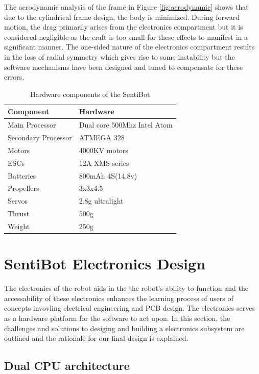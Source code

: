 \documentclass[12pt]{article}
\begin{document}
The aerodynamic analysis of the frame in Figure \ref{fig:aerodynamic} shows that due to the cylindrical frame design, the body is minimized. During forward motion, the drag primarily arises from the electronics compartment but it is considered negligible as the craft is too small for these effects to manifest in a significant manner. The one-sided nature of the electronics compartment results in the loss of radial symmetry which gives rise to some instability but the software mechanisms have been designed and tuned to compensate for these errors.

\begin{table}[h]
	\centering
	\begin{tabular}{ | l | l | }
		Component & Hardware \\
		\hline
		Main Processor & Dual core 500Mhz Intel Atom \\
		Secondary Processor & ATMEGA 328 \\
		Motors & 4000KV motors \\
		ESCs & 12A XMS series \\
		Batteries & 800mAh 4S(14.8v) \\
		Propellers & 3x3x4.5 \\
		Servos & 2.8g ultralight \\
		Thrust & 500g \\
		Weight & 250g \\
	\end{tabular}
	\caption{Hardware components of the SentiBot}
	\label{fig:components}
\end{table}

\section{SentiBot Electronics Design}

The electronics of the robot aids in the the robot's ability to function and the accessability of these electronics enhances the learning process of users of concepts invovling electrical engineering and PCB design. The electronics serves as a hardware platform for the software to act upon. In this section, the challenges and solutions to desiging and building a electronics subsystem are outlined and the rationale for our final design is explained.

\subsection{Dual CPU architecture}
\end{document}
